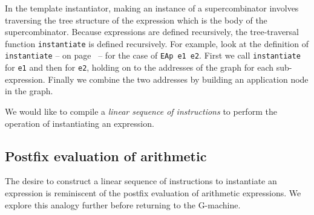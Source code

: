 In the template instantiator, making an instance of a supercombinator
involves traversing the tree structure of the expression which is the
body of the supercombinator.  Because expressions are defined
recursively, the tree-traversal function \mbox{\tt instantiate} is defined
recursively. For example, look at the definition of \mbox{\tt instantiate} -- on
page~\pageref{page:instantiate} -- for the case of \mbox{\tt EAp}~\mbox{\tt e1}~\mbox{\tt e2}. First
we call \mbox{\tt instantiate} for \mbox{\tt e1} and then for \mbox{\tt e2}, holding on to the
addresses of the graph for each sub-expression.  Finally we combine
the two addresses by building an application node in the graph.

We would like to compile a {\em linear sequence of
instructions\/} to perform the
operation of instantiating an expression.

\subsection{Postfix evaluation of arithmetic}

The desire to construct a linear sequence of instructions to
instantiate an expression is reminiscent of the postfix evaluation of
arithmetic expressions. We explore this analogy further before
returning to the G-machine.

